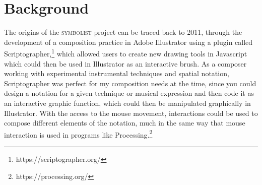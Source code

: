 \documentclass{article}
\title{\papertitle}
\def\symbolist{\textsc{symbolist}\xspace}
\begin{document}
%
\capstartfalse
\maketitle
\capstarttrue


\begin{abstract}
  \symbolist is an in-development application for experimental notation, with the goal of creating a working environment for developing symbolic notation for multimedia which can be interpreted and performed by electronics. The program aims to provide an open play space, with tools for experimentation, and thinking visually about relationships between representation and interpretation in media performance. 

The evaluation and re-design of the application based on the need for a bi-directional mapping framework for working with symbolic notation and its corresponding data representations.

In the paper we begin with an overview of the project context background, followed by an introduction to the new symbol definition system, and conclude with a perspective on future development directions.

\end{abstract}



\section{Background}\label{sec:background}

The origins of the \symbolist project can be traced back to 2011, through the development of a composition practice in Adobe Illustrator using a plugin called Scriptographer,\footnote{https://scriptographer.org/} which allowed users to create new drawing tools in Javascript which could then be used in Illustrator as an interactive brush. 
As a composer working with experimental instrumental techniques and spatial notation, Scriptographer was perfect for my composition needs at the time, since you could design a notation for a given technique or musical expression and then code it as an interactive graphic function, which could then be manipulated graphically in Illustrator. 
With the access to the mouse movement, interactions could be used to compose different elements of the notation, much in the same way that mouse interaction is used in programs like Processing.\footnote{https://processing.org/}
\end{document}

